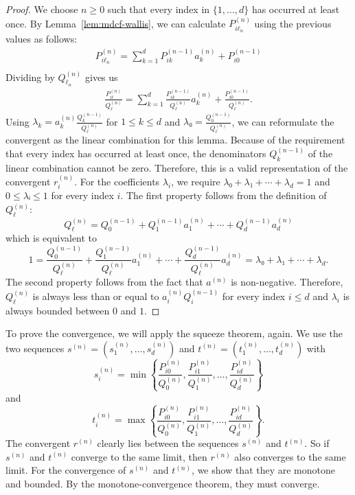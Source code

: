\begin{proof}
  We choose $n ≥ 0$ such that every index in $\{1, …, d\}$ has occurred at least once.
  By Lemma~\ref{lem:mdcf-wallis}, we can calculate $P_{iℓ_n}^{(n)}$ using the previous values as follows:
  \begin{align*}
    P_{iℓ_n}^{(n)} = \sum_{k = 1}^d P_{ik}^{(n-1)} a_k^{(n)} + P_{i0}^{(n-1)} \\
  \end{align*}
  Dividing by $Q_{ℓ_n}^{(n)}$ gives us
  \begin{align*}
    \frac{P_{iℓ}^{(n)}}{Q_{ℓ}^{(n)}} = \sum_{k = 1}^d \frac{P_{ik}^{(n-1)}}{Q_ℓ^{(n)}} a_k^{(n)} + \frac{P_{i0}^{(n-1)}}{Q_ℓ^{(n)}}.
  \end{align*}
  Using $λ_k = a_k^{(n)} \frac{Q_k^{(n-1)}}{Q_ℓ^{(n)}}$ for $1 ≤ k ≤ d$ and $λ₀ = \frac{Q_0^{(n-1)}}{Q_ℓ^{(n)}}$,
  we can reformulate the convergent as the linear combination for this lemma.
  Because of the requirement that every index has occurred at least once,
  the denominators $Q_k^{(n-1)}$ of the linear combination cannot be zero.
  Therefore, this is a valid representation of the convergent $r_i^{(n)}$.
  For the coefficients $λ_i$, we require $λ₀ + λ₁ + ⋯ + λ_d = 1$ and $0 ≤ λᵢ ≤ 1$ for every index $i$.
  The first property follows from the definition of $Q_ℓ^{(n)}$:
  \[
    Q_ℓ^{(n)} = Q_0^{(n-1)} + Q_1^{(n-1)} a_1^{(n)} + ⋯ + Q_d^{(n-1)} a_d^{(n)}
  \]
  which is equivalent to
  \[
    1 = \frac{Q_0^{(n-1)}}{Q_ℓ^{(n)}} + \frac{Q_1^{(n-1)}}{Q_ℓ^{(n)}} a_1^{(n)} + ⋯ + \frac{Q_d^{(n-1)}}{Q_ℓ^{(n)}} a_d^{(n)} = λ₀ + λ₁ + ⋯ + λ_d.
  \]
  The second property follows from the fact that $a^{(n)}$ is non-negative.
  Therefore, $Q_ℓ^{(n)}$ is always less than or equal to $a_i^{(n)}
  Q_i^{(n-1)}$ for every index $i ≤ d$ and $λ_i$ is always bounded
  between $0$ and $1$.
\end{proof}

To prove the convergence, we will apply the squeeze theorem, again.
We use the two sequences $s^{(n)} = (s_1^{(n)}, …, s_d^{(n)})$ and $t^{(n)} = (t_1^{(n)}, …, t_d^{(n)})$ with
\[
  s_i^{(n)} = \min\left\{\frac{P_{i0}^{(n)}}{Q_0^{(n)}}, \frac{P_{i1}^{(n)}}{Q_1^{(n)}}, …, \frac{P_{id}^{(n)}}{Q_d^{(n)}}\right\}
\]
and
\[
  t_i^{(n)} = \max\left\{\frac{P_{i0}^{(n)}}{Q_0^{(n)}}, \frac{P_{i1}^{(n)}}{Q_1^{(n)}}, …, \frac{P_{id}^{(n)}}{Q_d^{(n)}}\right\}.
\]
The convergent $r^{(n)}$ clearly lies between the sequences $s^{(n)}$ and $t^{(n)}$.
So if $s^{(n)}$ and $t^{(n)}$ converge to the same limit, then $r^{(n)}$ also
converges to the same limit.
For the convergence of $s^{(n)}$ and $t^{(n)}$, we show that they are monotone
and bounded.
By the monotone-convergence theorem, they must converge.

